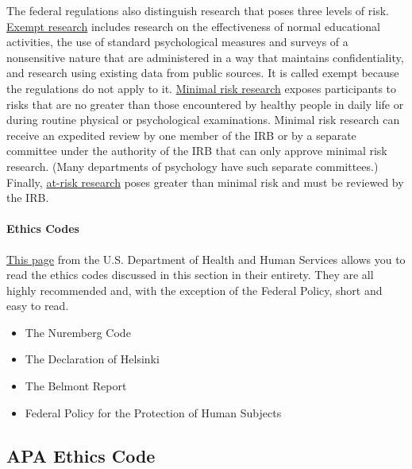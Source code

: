 \documentclass[
]{krantz}
\providecommand{\tightlist}{%
  \setlength{\itemsep}{0pt}\setlength{\parskip}{0pt}}
\begin{document}
The federal regulations also distinguish research that poses three levels of risk. \hyperref[exempt-research]{Exempt research} includes research on the effectiveness of normal educational activities, the use of standard psychological measures and surveys of a nonsensitive nature that are administered in a way that maintains confidentiality, and research using existing data from public sources. It is called exempt because the regulations do not apply to it. \hyperref[minimal-risk-research]{Minimal risk research} exposes participants to risks that are no greater than those encountered by healthy people in daily life or during routine physical or psychological examinations. Minimal risk research can receive an expedited review by one member of the IRB or by a separate committee under the authority of the IRB that can only approve minimal risk research. (Many departments of psychology have such separate committees.) Finally, \hyperref[at-risk-research]{at-risk research} poses greater than minimal risk and must be reviewed by the IRB.

\paragraph*{Ethics Codes}\label{ethics-codes}

\href{https://www.hhs.gov/ohrp/international/ethical-codes-and-research-standards/index.html}{This page} from the U.S. Department of Health and Human Services allows you to read the ethics codes discussed in this section in their entirety. They are all highly recommended and, with the exception of the Federal Policy, short and easy to read.

\begin{itemize}
\tightlist
\item
  The Nuremberg Code
\item
  The Declaration of Helsinki
\item
  The Belmont Report
\item
  Federal Policy for the Protection of Human Subjects
\end{itemize}

\subsection*{APA Ethics Code}\label{apa-ethics-code}
\end{document}
